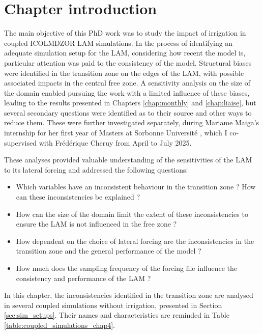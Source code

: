 \section{Chapter introduction}

The main objective of this PhD work was to study the impact of irrigation in coupled ICOLMDZOR LAM simulations.
In the process of identifying an adequate simulation setup for the LAM, considering how recent the model is, particular attention was paid to the consistency of the model. 
Structural biases were identified in the transition zone on the edges of the LAM, with possible associated impacts in the central free zone. 
A sensitivity analysis on the size of the domain enabled pursuing the work with a limited influence of these biases, leading to the results presented in Chapters \ref{chap:monthly} and \ref{chap:liaise}, but several secondary questions were identified as to their source and other ways to reduce them. 
These were further investigated separately, during Mariame Maiga's internship for her first year of Masters at Sorbonne Université \citep{maiga2025}, which I co-supervised with Frédérique Cheruy from April to July 2025. 

These analyses provided valuable understanding of the sensitivities of the LAM to its lateral forcing and addressed the following questions: 
\begin{itemize}
    \item Which variables have an inconsistent behaviour in the transition zone ? How can these inconsistencies be explained ?
    \item How can the size of the domain limit the extent of these inconsistencies to ensure the LAM is not influenced in the free zone ?
    \item How dependent on the choice of lateral forcing are the inconsistencies in the transition zone and the general performance of the model ?
    \item How much does the sampling frequency of the forcing file influence the consistency and performance of the LAM ?
\end{itemize}

\hfill

In this chapter, the inconsistencies identified in the transition zone are analysed in several coupled simulations without irrigation, presented in Section \ref{sec:sim_setups}. Their names and characteristics are reminded in Table \ref{table:coupled_simulations_chap4}.

